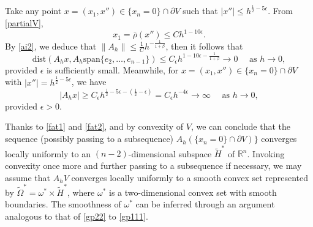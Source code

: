 \documentclass[11pt]{amsart}
\theoremstyle{plain}
\newcommand{\0}{\textbf{0}}
\numberwithin{equation}{section}
\numberwithin{equation}{section}
\numberwithin{figure}{section}
\begin{document}
Take any point \(x = (x_1, x'') \in \{x_n = 0\} \cap \partial V\) such that \(|x''| \leq h^{\frac{1}{2}-5\epsilon}\).
From \eqref{partialV},
\[x_1 = \bar\rho(x'') \leq Ch^{1-10\epsilon}.\] 
By \eqref{ai2}, we deduce that \(\|A_h\| \leq \frac{1}{C} h^{-\frac{1}{1+\beta}}\), then it follows that
\begin{equation}\label{fat1}
\text{dist}\left(A_hx, A_h\text{span}\{e_2, \ldots, e_{n-1}\}\right) \leq C_\epsilon h^{1-10\epsilon-\frac{1}{1+\beta}} \to 0\quad \text{ as } h \to 0,
\end{equation}
provided \(\epsilon\) is sufficiently small.
Meanwhile, for \(x = (x_1, x'') \in \{x_n = 0\} \cap \partial V\) with \(|x''| = h^{\frac{1}{2}-5\epsilon}\), we have 
\begin{equation}\label{fat2}
|A_hx| \geq C_\epsilon h^{\frac{1}{2}-5\epsilon-(\frac{1}{2}-\epsilon)} =  C_\epsilon h^{-4\epsilon} \to \infty \quad \text{ as } h \to 0,
\end{equation}
provided \(\epsilon > 0\).

Thanks to \eqref{fat1} and \eqref{fat2}, and by convexity of $V$, we can conclude that the sequence (possibly passing to a subsequence) \( A_h(\{x_n=0\} \cap \partial V)\} \) converges locally uniformly to an \((n-2)\)-dimensional subspace \(\tilde{H}^*\) of \(\mathbb{R}^n\). Invoking convexity once more and further passing to a subsequence if necessary, we may assume that \( A_h V \) converges locally uniformly to a smooth convex set represented by \(\tilde{\Omega}^* = \omega^* \times \tilde{H}^*\), where \(\omega^*\) is a two-dimensional convex set with smooth boundaries. The smoothness of \(\omega^*\) can be inferred through an argument analogous to that of \eqref{gp22} to \eqref{gp111}.


\end{document}
